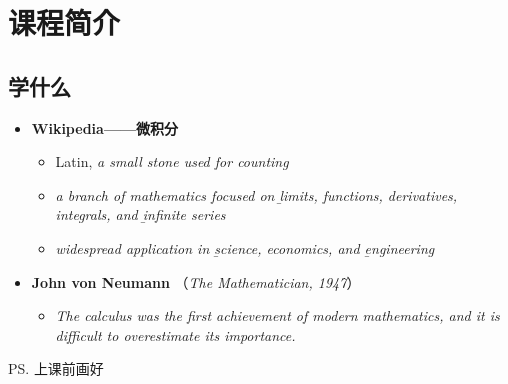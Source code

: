 \section{课程简介}

\subsection{学什么}

\begin{itemize}
	  \item {\bf Wikipedia——微积分} 
	\begin{itemize}
	  \item Latin, {\it a small stone used for counting}  
	  \item {\it a branch of mathematics focused on {\b limits, functions,
	  	derivatives, integrals,}  and {\b infinite series}} 
  	  \item {\it widespread application in {\b science, economics,} and {\b
  	  engineering}} 
	\end{itemize}
	\item {\bf John von Neumann} （{\small\it The Mathematician, 1947}）
	\begin{itemize}
	  \item {\it The calculus was the first achievement of modern
	  mathematics, and it is difficult to overestimate its importance.}
	\end{itemize} 
\end{itemize}

\begin{center}
	\ps{上课前画好}
\end{center}

